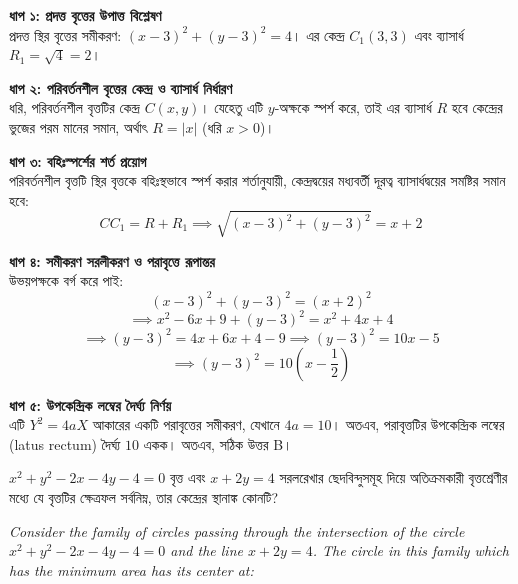 \documentclass[12pt, a4paper]{article}
\begin{document}
\begin{tcolorbox}[solutionbox={সমাধান (Solution)}]
    \noindent
    \textbf{ধাপ ১: প্রদত্ত বৃত্তের উপাত্ত বিশ্লেষণ} \\
    প্রদত্ত স্থির বৃত্তের সমীকরণ: $(x-3)^2 + (y-3)^2 = 4$। 
    এর কেন্দ্র $C_1(3, 3)$ এবং ব্যাসার্ধ $R_1 = \sqrt{4} = 2$।
    
    \vspace{0.5em}
    \noindent\textbf{ধাপ ২: পরিবর্তনশীল বৃত্তের কেন্দ্র ও ব্যাসার্ধ নির্ধারণ} \\
    ধরি, পরিবর্তনশীল বৃত্তটির কেন্দ্র $C(x, y)$। 
    যেহেতু এটি $y$-অক্ষকে স্পর্শ করে, তাই এর ব্যাসার্ধ $R$ হবে কেন্দ্রের ভুজের পরম মানের সমান, অর্থাৎ $R = |x|$ (ধরি $x > 0$)।
    
    \vspace{0.5em}
    \noindent\textbf{ধাপ ৩: বহিঃস্পর্শের শর্ত প্রয়োগ} \\
    পরিবর্তনশীল বৃত্তটি স্থির বৃত্তকে বহিঃস্থভাবে স্পর্শ করার শর্তানুযায়ী, কেন্দ্রদ্বয়ের মধ্যবর্তী দূরত্ব ব্যাসার্ধদ্বয়ের সমষ্টির সমান হবে:
    \[ CC_1 = R + R_1 \implies \sqrt{(x - 3)^2 + (y - 3)^2} = x + 2 \]
    
    \vspace{0.5em}
    \noindent\textbf{ধাপ ৪: সমীকরণ সরলীকরণ ও পরাবৃত্তে রূপান্তর} \\
    উভয়পক্ষকে বর্গ করে পাই:
    \[ (x - 3)^2 + (y - 3)^2 = (x + 2)^2 \]
    \[ \implies x^2 - 6x + 9 + (y - 3)^2 = x^2 + 4x + 4 \]
    \[ \implies (y - 3)^2 = 4x + 6x + 4 - 9 \implies (y - 3)^2 = 10x - 5 \]
    \[ \implies (y - 3)^2 = 10\left(x - \frac{1}{2}\right) \]
    
    \vspace{0.5em}
    \noindent\textbf{ধাপ ৫: উপকেন্দ্রিক লম্বের দৈর্ঘ্য নির্ণয়} \\
    এটি $Y^2 = 4aX$ আকারের একটি পরাবৃত্তের সমীকরণ, যেখানে $4a = 10$। 
    অতএব, পরাবৃত্তটির উপকেন্দ্রিক লম্বের (latus rectum) দৈর্ঘ্য $10$ একক।
    অতএব, সঠিক উত্তর B।
\end{tcolorbox}
\begin{tcolorbox}[questionbox={প্রশ্ন (Question) 9}]
    \noindent
    $x^2 + y^2 - 2x - 4y - 4 = 0$ বৃত্ত এবং $x + 2y = 4$ সরলরেখার ছেদবিন্দুসমূহ দিয়ে অতিক্রমকারী বৃত্তশ্রেণীর মধ্যে যে বৃত্তটির ক্ষেত্রফল সর্বনিম্ন, তার কেন্দ্রের স্থানাঙ্ক কোনটি?
    
    \vspace{0.8em}
    \begin{english}
    \noindent\textit{\color{darkgray}
    Consider the family of circles passing through the intersection of the circle $x^2 + y^2 - 2x - 4y - 4 = 0$ and the line $x + 2y = 4$. The circle in this family which has the minimum area has its center at:
    }
    \end{english}
\end{tcolorbox}
\end{document}
